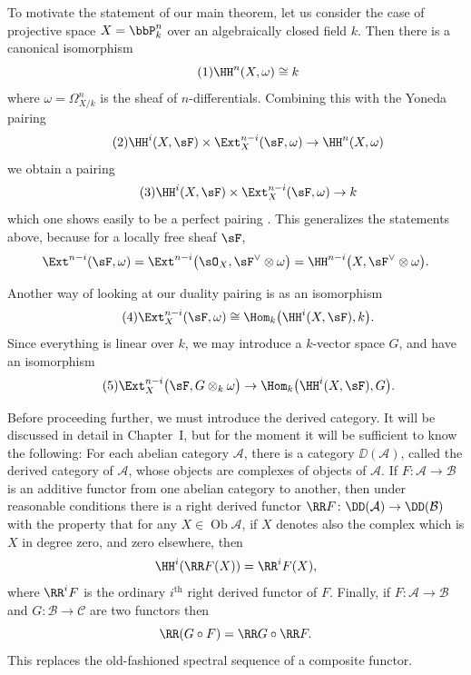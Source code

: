 To motivate the statement of our main theorem, let us consider the case of projective space $X=\bbP_{k}^{n}$ over an algebraically closed field $k$. Then there is a canonical isomorphism
\begin{equation}\tag{1}\label{eq:1}
	\HH^{n}(X, \omega)\cong k
\end{equation}
where $\omega=\Omega_{X/k}^{n}$ is the sheaf of $n$-differentials. Combining this with the Yoneda pairing
\begin{equation}\tag{2}\label{eq:2}
	\HH^{i}(X, \sF)\times \Ext_{X}^{n-i}(\sF,\omega)\to \HH^{n}(X,\omega)
\end{equation}
we obtain a pairing
\begin{equation}\tag{3}\label{eq:3}
	\HH^{i}(X, \sF)\times \Ext_{X}^{n-i}(\sF,\omega)\to k
\end{equation}
which one shows easily to be a perfect pairing \cite[, expos\'e~12]{SGA}. This generalizes the statements above, because for a locally free sheaf $\sF$,
\[
\Ext^{n-i}(\sF,\omega)=\Ext^{n-i}\bigl(\sO_{X},\sF^{\vee}\otimes\omega\bigr)=\HH^{n-i}\bigl(X,\sF^{\vee}\otimes\omega\bigr).
\]

Another way of looking at our duality pairing is as an isomorphism
\begin{equation}\tag{4}\label{eq:4}
	\Ext_{X}^{n-i}(\sF,\omega)\cong \Hom_{k}\bigl(\HH^{i}(X,\sF),k\bigr).
\end{equation}
Since everything is linear over $k$, we may introduce a $k$-vector space $G$, and have an isomorphism
\begin{equation}\tag{5}\label{eq:5}
	\Ext_{X}^{n-i}\bigl(\sF,G\otimes_{k}\omega\bigr)\to \Hom_{k}\bigl(\HH^{i}(X,\sF),G\bigr).
\end{equation}

Before proceeding further, we must introduce the derived category. It will be discussed in detail in Chapter~I, but for the moment it will be sufficient to know the following: For each abelian category $\mathcal{A}$, there is a category $\DD(\mathcal{A})$, called the derived category of $\mathcal{A}$, whose objects are complexes of objects of $\mathcal{A}$. If $F\colon\mathcal{A}\to\mathcal{B}$ is an additive functor from one abelian category to another, then under reasonable conditions there is a right derived functor $\RR F\colon \DD(\mathcal{A})\to \DD(\mathcal{B})$ with the property that for any $X\in\operatorname{Ob}\mathcal{A}$, if $X$ denotes also the complex which is $X$ in degree zero, and zero elsewhere, then
\[
\HH^{i}(\RR F(X))=\RR^{i}F(X),
\]
where $\RR^{i}F$ is the ordinary $i^{\text{th}}$ right derived functor of $F$. Finally, if $F\colon\mathcal{A}\to\mathcal{B}$ and $G\colon\mathcal{B}\to\mathcal{C}$ are two functors then
\[
\RR(G\circ F)=\RR G\circ \RR F.
\]
This replaces the old-fashioned spectral sequence of a composite functor.

